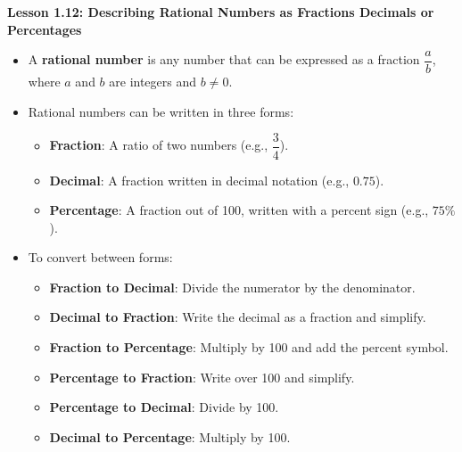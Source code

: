 \begin{center}
\textbf{Lesson 1.12: Describing Rational Numbers as Fractions Decimals or Percentages}
\end{center}

\vspace*{-1.5ex}

\begin{itemize}
    \item A \textbf{rational number} is any number that can be expressed as a fraction \(\dfrac{a}{b}\), where \(a\) and \(b\) are integers and \(b \neq 0\).
    \item Rational numbers can be written in three forms:
    \begin{itemize}
        \item \textbf{Fraction}: A ratio of two numbers (e.g., \(\dfrac{3}{4}\)).
        \item \textbf{Decimal}: A fraction written in decimal notation (e.g., \(0.75\)).
        \item \textbf{Percentage}: A fraction out of 100, written with a percent sign (e.g., \(75\%\)).
    \end{itemize}
    \item To convert between forms:
    \begin{itemize}
        \item \textbf{Fraction to Decimal}: Divide the numerator by the denominator.
        \item \textbf{Decimal to Fraction}: Write the decimal as a fraction and simplify.
        \item \textbf{Fraction to Percentage}: Multiply by 100 and add the percent symbol.
        \item \textbf{Percentage to Fraction}: Write over 100 and simplify.
        \item \textbf{Percentage to Decimal}: Divide by 100.
        \item \textbf{Decimal to Percentage}: Multiply by 100.
    \end{itemize}
\end{itemize}
